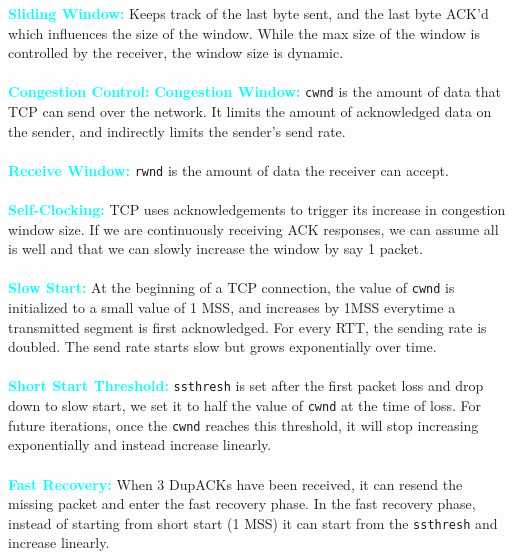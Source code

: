 \documentclass[]{article}
\begin{document}
\textcolor{Cyan}{\textbf{Sliding Window:}} Keeps track of the last byte sent, and the last byte ACK'd which influences the size of the window. While the max size of the window is controlled by the receiver, the window size is dynamic. \\\\
\textcolor{Cyan}{\textbf{Congestion Control:}} 
\textcolor{Cyan}{\textbf{Congestion Window:}} \texttt{cwnd} is the amount of data that TCP can send over the network. It limits the amount of acknowledged data on the sender, and indirectly limits the sender's send rate. \\\\
\textcolor{Cyan}{\textbf{Receive Window:}} \texttt{rwnd} is the amount of data the receiver can accept. \\\\
\textcolor{Cyan}{\textbf{Self-Clocking:}} TCP uses acknowledgements to trigger its increase in congestion window size. If we are continuously receiving ACK responses, we can assume all is well and that we can slowly increase the window by say 1 packet. \\\\
\textcolor{Cyan}{\textbf{Slow Start:}} At the beginning of a TCP connection, the value of \texttt{cwnd} is initialized to a small value of 1 MSS, and increases by 1MSS everytime a transmitted segment is first acknowledged. For every RTT, the sending rate is doubled. The send rate starts slow but grows exponentially over time. \\\\
\textcolor{Cyan}{\textbf{Short Start Threshold:}} \texttt{ssthresh} is set after the first packet loss and drop down to slow start, we set it to half the value of \texttt{cwnd} at the time of loss. For future iterations, once the \texttt{cwnd} reaches this threshold, it will stop increasing exponentially and instead increase linearly. \\\\ 
\textcolor{Cyan}{\textbf{Fast Recovery:}} When 3 DupACKs have been received, it can resend the missing packet and enter the fast recovery phase. In the fast recovery phase, instead of starting from short start (1 MSS) it can start from the \texttt{ssthresh} and increase linearly. 
\end{document}
